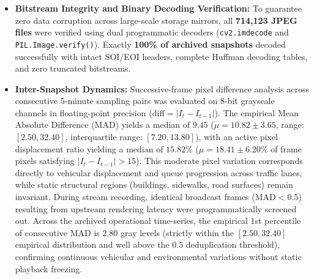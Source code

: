 \documentclass[preprint,12pt]{elsarticle}
\begin{document}
\begin{itemize}
    \begin{enumerate}
        \item \textit{Diurnal Luminance Attenuation:} Convective cloud cover reduced ambient daylight luminance $Y$ by an average of $\mathbf{14.2\%}$ relative to equivalent clear-sky afternoon hours.
        \item \textit{Pavement Specular Reflections:} Wet asphalt surfaces acted as semi-specular reflectors under vehicle headlights and street lamps, increasing local roadway pixel standard deviation from an ambient baseline of $\mathbf{28.4}$ to $\mathbf{41.6}$.
        \item \textit{Optical Robustness:} Despite atmospheric water droplet scattering, average edge sharpness during peak rainfall remained resilient at $\text{Var}(\nabla^2 I) = \mathbf{2,410 \pm 890}$, preserving macroscopic vehicle silhouette boundaries and queue demarcations.
    \end{enumerate}
    \item \textbf{Bitstream Integrity and Binary Decoding Verification:} To guarantee zero data corruption across large-scale storage mirrors, all \textbf{714,123 JPEG files} were verified using dual programmatic decoders (\texttt{cv2.imdecode} and \texttt{PIL.Image.verify()}). Exactly \textbf{100\% of archived snapshots} decoded successfully with intact SOI/EOI headers, complete Huffman decoding tables, and zero truncated bitstreams.
    \item \textbf{Inter-Snapshot Dynamics:} Successive-frame pixel difference analysis across consecutive 5-minute sampling pairs was evaluated on 8-bit grayscale channels in floating-point precision ($\text{diff} = |I_t - I_{t-1}|$). The empirical Mean Absolute Difference (MAD) yields a median of $\mathbf{9.45}$ ($\mu = 10.82 \pm 3.65$, range: $[2.50, 32.40]$, interquartile range: $[7.20, 13.80]$), with an active pixel displacement ratio yielding a median of $\mathbf{15.82\%}$ ($\mu = 18.41 \pm 6.20\%$ of frame pixels satisfying $|I_t - I_{t-1}| > 15$). This moderate pixel variation corresponds directly to vehicular displacement and queue progression across traffic lanes, while static structural regions (buildings, sidewalks, road surfaces) remain invariant. During stream recording, identical broadcast frames ($\text{MAD} < 0.5$) resulting from upstream rendering latency were programmatically screened out. Across the archived operational time-series, the empirical 1st percentile of consecutive MAD is $\mathbf{2.80}$ gray levels (strictly within the $[2.50, 32.40]$ empirical distribution and well above the $0.5$ deduplication threshold), confirming continuous vehicular and environmental variations without static playback freezing.
\end{itemize}
\end{document}
